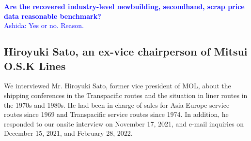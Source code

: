 \documentclass[11pt]{article}
\begin{document}


\textcolor{blue}{
\textbf{Are the recovered industry-level newbuilding, secondhand, scrap price data reasonable benchmark?} \\
Ashida: Yes or no. Reason.
}

\subsection{Hiroyuki Sato, an ex-vice chairperson of Mitsui O.S.K Lines}

We interviewed Mr. Hiroyuki Sato, former vice president of MOL, about the shipping conferences in the Transpacific routes and the situation in liner routes in the 1970s and 1980s. He had been in charge of sales for Asia-Europe service routes since 1969 and Transpacific service routes since 1974. In addition, he responded to our onsite interview on November 17, 2021, and e-mail inquiries on December 15, 2021, and February 28, 2022.\\
\end{document}
